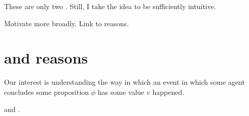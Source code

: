 \begin{note}
  These are only two .
  Still, I take the idea to be sufficiently intuitive.
\end{note}

\begin{note}
  Motivate more broadly.
  Link to reasons.
\end{note}

\section*{\issueInclusion{} and reasons}
\label{sec:reasons}

\begin{note}
  Our interest is understanding the way in which an event in which some agent \vAgent{} concludes some proposition \(\phi\) has some value \(v\) happened.

  \qWhy{} and \qHow{}.
\end{note}

